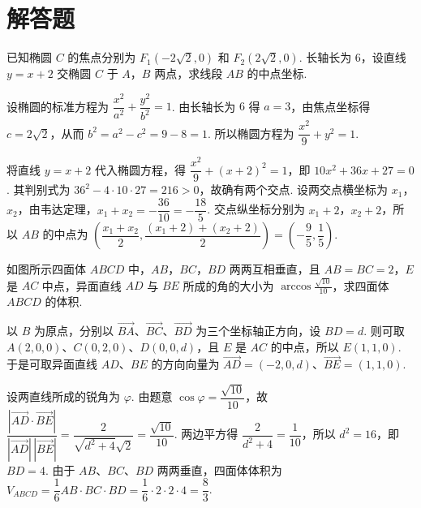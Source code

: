 \section{解答题}

\begin{problem}
已知椭圆 \(C\) 的焦点分别为 \(F_{1}(-2\sqrt{2},0)\) 和 \(F_{2}(2\sqrt{2},0)\). 长轴长为 6，设直线 \(y = x + 2\) 交椭圆 \(C\) 于 \(A\)，\(B\) 两点，求线段 \(AB\) 的中点坐标.
\end{problem}

\begin{solution}
设椭圆的标准方程为 \(\dfrac{x^2}{a^2}+\dfrac{y^2}{b^2}=1\). 由长轴长为 \(6\) 得 \(a=3\)，由焦点坐标得 \(c=2\sqrt{2}\)，从而 \(b^2=a^2-c^2=9-8=1\). 所以椭圆方程为 \(\dfrac{x^2}{9}+y^2=1\).

将直线 \(y=x+2\) 代入椭圆方程，得 \(\dfrac{x^2}{9}+(x+2)^2=1\)，即 \(10x^2+36x+27=0\). 其判别式为 \(36^2-4\cdot10\cdot27=216>0\)，故确有两个交点. 设两交点横坐标为 \(x_1\)，\(x_2\)，由韦达定理，\(x_1+x_2=-\dfrac{36}{10}=-\dfrac{18}{5}\). 交点纵坐标分别为 \(x_1+2\)，\(x_2+2\)，所以 \(AB\) 的中点为
\(\left(\dfrac{x_1+x_2}{2},\dfrac{(x_1+2)+(x_2+2)}{2}\right)=\left(-\dfrac{9}{5},\dfrac{1}{5}\right)\).
\end{solution}

\begin{problem}
如图所示四面体 \(ABCD\) 中，\(AB\)，\(BC\)，\(BD\) 两两互相垂直，且 \(AB = BC = 2\)，\(E\) 是 \(AC\) 中点，异面直线 \(AD\) 与 \(BE\) 所成的角的大小为 \(\arccos \frac{\sqrt{10}}{10}\)，求四面体 \(ABCD\) 的体积.

\end{problem}

\begin{solution}
以 \(B\) 为原点，分别以 \(\overrightarrow{BA}\)、\(\overrightarrow{BC}\)、\(\overrightarrow{BD}\) 为三个坐标轴正方向，设 \(BD=d\). 则可取 \(A(2,0,0)\)、\(C(0,2,0)\)、\(D(0,0,d)\)，且 \(E\) 是 \(AC\) 的中点，所以 \(E(1,1,0)\). 于是可取异面直线 \(AD\)、\(BE\) 的方向向量为 \(\overrightarrow{AD}=(-2,0,d)\)、\(\overrightarrow{BE}=(1,1,0)\).

设两直线所成的锐角为 \(\varphi\). 由题意 \(\cos\varphi=\dfrac{\sqrt{10}}{10}\)，故
\(\dfrac{|\overrightarrow{AD}\cdot\overrightarrow{BE}|}{|\overrightarrow{AD}|\,|\overrightarrow{BE}|}=\dfrac{2}{\sqrt{d^2+4}\sqrt{2}}=\dfrac{\sqrt{10}}{10}\).
两边平方得 \(\dfrac{2}{d^2+4}=\dfrac{1}{10}\)，所以 \(d^2=16\)，即 \(BD=4\). 由于 \(AB\)、\(BC\)、\(BD\) 两两垂直，四面体体积为
\(V_{ABCD}=\dfrac{1}{6}AB\cdot BC\cdot BD=\dfrac{1}{6}\cdot2\cdot2\cdot4=\dfrac{8}{3}\).
\end{solution}

